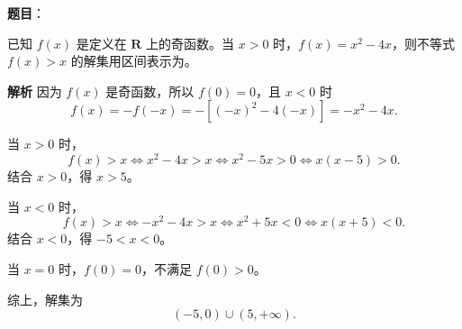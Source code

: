 \begin{answer}

\textbf{题目}：

已知 $f(x)$ 是定义在 $\mathbf R$ 上的奇函数。当 $x>0$ 时，$f(x)=x^2-4x$，则不等式 $f(x)>x$ 的解集用区间表示为\gkblank{}。

\textbf{解析}
因为 $f(x)$ 是奇函数，所以 $f(0)=0$，且 $x<0$ 时
\nopagebreak[4]
\[f(x)=-f(-x)=-\left[(-x)^2-4(-x)\right]=-x^2-4x.\]

当 $x>0$ 时，
\nopagebreak[4]
\[f(x)>x\Longleftrightarrow x^2-4x>x
\Longleftrightarrow x^2-5x>0
\Longleftrightarrow x(x-5)>0.\]
结合 $x>0$，得 $x>5$。

当 $x<0$ 时，
\nopagebreak[4]
\[f(x)>x\Longleftrightarrow -x^2-4x>x
\Longleftrightarrow x^2+5x<0
\Longleftrightarrow x(x+5)<0.\]
结合 $x<0$，得 $-5<x<0$。

当 $x=0$ 时，$f(0)=0$，不满足 $f(0)>0$。

综上，解集为
\nopagebreak[4]
\[(-5,0)\cup(5,+\infty).\]


\end{answer}
